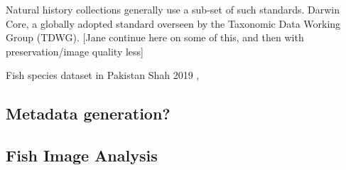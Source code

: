 \documentclass[screen,review]{acmart}
\begin{document}
Natural history collections generally use a sub-set of such standards. Darwin Core, a globally adopted standard overseen by the Taxonomic Data Working Group (TDWG).  [Jane continue here on some of this, and then with preservation/image quality less]

Fish species dataset in Pakistan Shah 2019 \cite{Shah2019FishPakFS},

\subsection{Metadata generation?}

\subsection{Fish Image Analysis}
\end{document}
